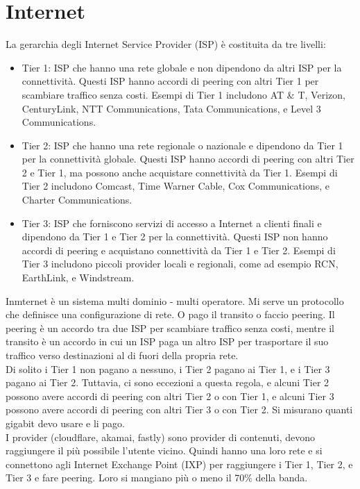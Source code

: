 \section{Internet}
La gerarchia degli Internet Service Provider (ISP) è costituita da tre livelli:
\begin{itemize}
    \item Tier 1: ISP che hanno una rete globale e non dipendono da altri ISP per la connettività. Questi ISP hanno accordi di peering con altri Tier 1 per scambiare traffico senza costi. Esempi di Tier 1 includono AT \& T, Verizon, CenturyLink, NTT Communications, Tata Communications, e Level 3 Communications.
    \item Tier 2: ISP che hanno una rete regionale o nazionale e dipendono da Tier 1 per la connettività globale. Questi ISP hanno accordi di peering con altri Tier 2 e Tier 1, ma possono anche acquistare connettività da Tier 1. Esempi di Tier 2 includono Comcast, Time Warner Cable, Cox Communications, e Charter Communications.
    \item Tier 3: ISP che forniscono servizi di accesso a Internet a clienti finali e dipendono da Tier 1 e Tier 2 per la connettività. Questi ISP non hanno accordi di peering e acquistano connettività da Tier 1 e Tier 2. Esempi di Tier 3 includono piccoli provider locali e regionali, come ad esempio RCN, EarthLink, e Windstream.
\end{itemize}

Inmternet è un sistema multi dominio - multi operatore. Mi serve un protocollo che definisce una configurazione di rete. O pago il transito o faccio peering. Il peering è un accordo tra due ISP per scambiare traffico senza costi, mentre il transito è un accordo in cui un ISP paga un altro ISP per trasportare il suo traffico verso destinazioni al di fuori della propria rete.\\

Di solito i Tier 1 non pagano a nessuno, i Tier 2 pagano ai Tier 1, e i Tier 3 pagano ai Tier 2. Tuttavia, ci sono eccezioni a questa regola, e alcuni Tier 2 possono avere accordi di peering con altri Tier 2 o con Tier 1, e alcuni Tier 3 possono avere accordi di peering con altri Tier 3 o con Tier 2. Si misurano quanti gigabit devo usare e li pago.\\

I provider (cloudflare, akamai, fastly) sono provider di contenuti, devono raggiungere il più possibile l'utente vicino. Quindi hanno una loro rete e si connettono agli Internet Exchange Point (IXP) per raggiungere i Tier 1, Tier 2, e Tier 3 e fare peering. Loro si mangiano più o meno il 70\% della banda.\\

